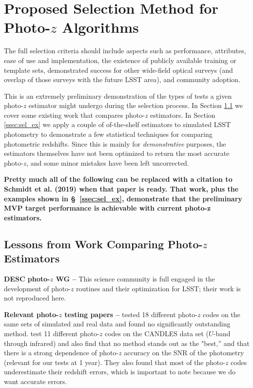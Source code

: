 \documentclass[DM,lsstdraft,toc]{lsstdoc}
\begin{document}
\clearpage
\section{Proposed Selection Method for Photo-$z$ Algorithms} \label{sec:sel}

The full selection criteria should include aspects such as performance, attributes, ease of use and implementation, the existence of publicly available training or template sets, demonstrated success for other wide-field optical surveys (and overlap of those surveys with the future LSST area), and community adoption.

This is an extremely preliminary demonstration of the types of tests a given photo-$z$ estimator might undergo during the selection process. 
In Section \ref{ssec:sel_lit} we cover some existing work that compares photo-$z$ estimators. 
In Section \ref{ssec:sel_ex} we apply a couple of of-the-shelf estimators to simulated LSST photometry to demonstrate a few statistical techniques for comparing photometric redshifts.
Since this is mainly for {\it demonstrative} purposes, the estimators themselves have not been optimized to return the most accurate photo-$z$, and some minor mistakes have been left uncorrected.

{\bf Pretty much all of the following can be replaced with a citation to Schmidt et al. (2019) when that paper is ready. That work, plus the examples shown in \S~\ref{ssec:sel_ex}, demonstrate that the preliminary MVP target performance is achievable with current photo-z estimators.} 

\subsection{Lessons from Work Comparing Photo-$z$ Estimators}\label{ssec:sel_lit}

\textbf{DESC photo-$z$ WG --} This science community is full engaged in the development of photo-$z$ routines and their optimization for LSST; their work is not reproduced here.

\textbf{Relevant photo-$z$ testing papers --} \cite{2010A&A...523A..31H} tested 18 different photo-$z$ codes on the same sets of simulated and real data and found no significantly outstanding method. \cite{2013ApJ...775...93D} test 11 different photo-$z$ codes on the CANDLES data set ($U$-band through infrared) and also find that no method stands out as the "best,'' and that there is a strong dependence of photo-$z$ accuracy on the SNR of the photometry (relevant for our tests at 1 year). They also found that most of the photo-$z$ codes underestimate their redshift errors, which is important to note because we do want accurate errors.
\end{document}
